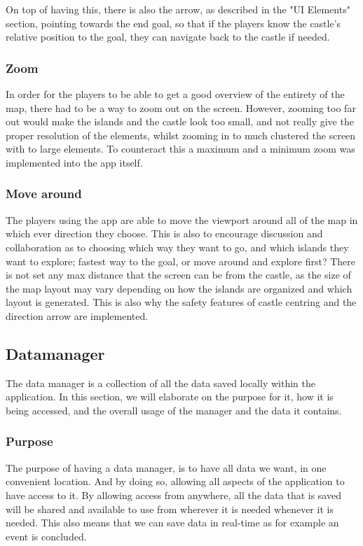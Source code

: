 On top of having this, there is also the arrow, as described in the "UI Elements" section, pointing towards the end goal, so that if the players know the castle's relative position to the goal, they can navigate back to the castle if needed. 

\subsubsection{Zoom}
In order for the players to be able to get a good overview of the entirety of the map, there had to be a way to zoom out on the screen. 
However, zooming too far out would make the islands and the castle look too small, and not really give the proper resolution of the elements, whilst zooming in to much clustered the screen with to large elements. To counteract this a maximum and a minimum zoom was implemented into the app itself.	

	
\subsubsection{Move around}

The players using the app are able to move the viewport around all of the map in which ever direction they choose. This is also to encourage discussion and collaboration as to choosing which way they want to go, and which islands they want to explore; fastest way to the goal, or move around and explore first?
There is not set any max distance that the screen can be from the castle, as the size of the map layout may vary depending on how the islands are organized and which layout is generated. This is also why the safety features of castle centring and the direction arrow are implemented.

\subsection{Datamanager}
\label{sec:datman}
The data manager is a collection of all the data saved locally within the application. In this section, we will elaborate on the purpose for it, how it is being accessed, and the overall usage of the manager and the data it contains.

\subsubsection{Purpose}
	
The purpose of having a data manager, is to have all data we want, in one convenient location. And by doing so, allowing all aspects of the application to have access to it. By allowing access from anywhere, all the data that is saved will be shared and available to use from wherever it is needed whenever it is needed. This also means that we can save data in real-time as for example an event is concluded.


